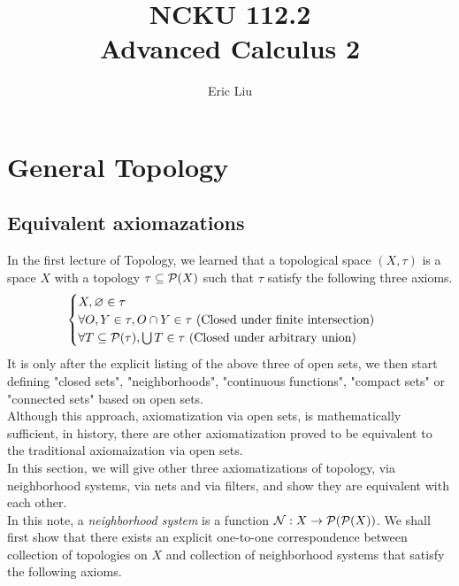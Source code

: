 \documentclass{report}
\title{\Huge{NCKU 112.2}\\
Advanced Calculus 2}
\author{\huge{Eric Liu}}
\date{}
\begin{document}
\maketitle
\newpage%
\tableofcontents
\pagebreak

\chapter{General Topology}
\section{Equivalent axiomazations}
\begin{mdframed}
In the first lecture of Topology, we learned that a topological space $(X,\tau)$ is a space $X$ with a topology  $\tau \subseteq \mathcal{P}(X)$ such that $\tau$ satisfy the following three axioms.
\begin{align}
\label{1.1}
\begin{cases}
X,\varnothing \in \tau\\
\forall O,Y \in \tau, O \cap Y \in \tau\text{ (Closed under finite intersection) }\\
\forall T \subseteq \mathcal{P}(\tau), \bigcup T \in \tau\text{ (Closed under arbitrary union) }
\end{cases}
\end{align}
It is only after the explicit listing of the above three of open sets, we then start defining "closed sets", "neighborhoods", "continuous functions", "compact sets" or "connected sets" based on open sets.\\

Although this approach, axiomatization via open sets, is mathematically sufficient, in history, there are other axiomatization proved to be equivalent to the traditional axiomaization via open sets.\\

In this section, we will give other three axiomatizations of topology, via neighborhood systems, via nets and via filters, and show they are equivalent with each other.\\

In this note, a \textit{neighborhood system} is a function $\mathcal{N}:X\rightarrow \mathcal{P}(\mathcal{P}(X))$. We shall first show that there exists an explicit one-to-one correspondence between collection of topologies on $X$ and collection of neighborhood systems that satisfy the following axioms.  
\end{mdframed}
\end{document}
